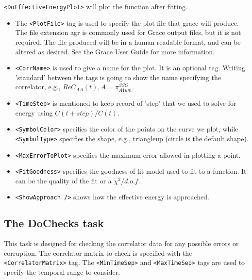\documentclass[12pt]{article}
\newcommand{\vb}{\texttt}
\begin{document}
\vb{<DoEffectiveEnergyPlot>} will plot the function after fitting.

\begin{itemize}
\item The \vb{<PlotFile>} tag is used to specify the plot file that grace will produce. The file extension agr is commonly used for Grace output files, but it is not required. The file produced will be in a human-readable format, and can be altered as desired. See the Grace User Guide for more information.

\item \vb{<CorrName>} is used to give a name for the plot. It is an optional tag. Writing 'standard' between the tags is going to show the name specifying the correlator, e.g., $Re C_{AA}(t), A = \pi_{A1um}^{SSO}$.

\item \vb{<TimeStep>} is mentioned to keep record of 'step' that we used to solve for energy using $C(t+step)/C(t)$.

\item \vb{<SymbolColor>} specifies the color of the points on the curve we plot, while \vb{<SymbolType>} specifies the shape, e.g., triangleup (circle is the default shape).

\item \vb{<MaxErrorToPlot>} specifies the maximum error allowed in plotting a point.

\item \vb{<FitGoodness>} specifies the goodness of fit model used to fit to a function. It can be the
quality of the fit or a $\chi^2/d.o.f.$. 

\item \vb{<ShowApproach />} shows how the effective energy is approached.
\end{itemize}

\subsection{The DoChecks task}

This task is designed for checking the correlator data for any possible errors
or corruption.
The correlator matrix to check is specified with the \vb{<CorrelatorMatrix>} tag.
The \vb{<MinTimeSep>} and \vb{<MaxTimeSep>} tags are used to specify the temporal
range to consider.
\end{document}
